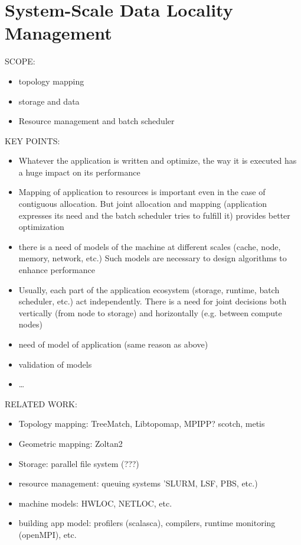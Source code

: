 \chapter{System-Scale Data Locality Management}
\label{ch:systemscale}







SCOPE:

\begin{itemize}
\item topology mapping
\item storage and data
\item Resource management and batch scheduler
\end{itemize}

KEY POINTS:
\begin{itemize}
\item Whatever the application is written and optimize, the way it is executed
  has a huge impact on its performance
 \item Mapping of application to resources is important even in the case of
   contiguous allocation. But joint allocation and mapping  (application
   expresses its need and the batch scheduler tries to fulfill it) provides
   better optimization
\item there is a need of models of the machine at different scales (cache, node,
memory, network, etc.) Such models are necessary to design algorithms to enhance
performance
  \item Usually, each part of the application ecosystem (storage, runtime, batch
    scheduler, etc.) act independently. There is a need for joint decisions both
    vertically (from node to storage) and horizontally (e.g. between compute
    nodes)
\item need of model of application (same reason as above)
\item validation of models
\item \ldots
\end{itemize}

RELATED WORK: 

\begin{itemize}
\item Topology mapping: TreeMatch, Libtopomap, MPIPP? scotch, metis  
\item Geometric mapping: Zoltan2
\item Storage: parallel file system (???)
\item resource management: queuing systems 'SLURM, LSF, PBS, etc.)
\item machine models: HWLOC, NETLOC, etc. 
\item building app model: profilers (scalasca), compilers, runtime monitoring (openMPI), etc. 
\end{itemize}

